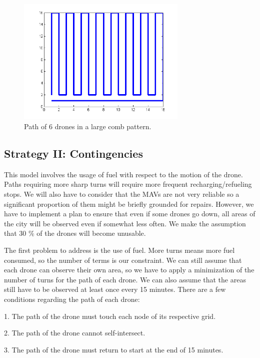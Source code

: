 \documentclass{article}
\begin{document}
\begin{figure}[htb!]
\begin{center}
\includegraphics[width=3.2in]{Comb.png}
\end{center}
\caption{Path of 6 drones in a large comb pattern.
\label{Comb}}
\end{figure}


\newpage 

\subsection{Strategy II: Contingencies}

This model involves the usage of fuel with respect to the motion of the drone. Paths requiring more sharp turns will require more frequent recharging/refueling stops. We will also have to consider that the MAVs are not very reliable so a significant proportion of them might be briefly grounded for repairs. However, we have to implement a plan to ensure that even if some drones go down, all areas of the city will be observed even if somewhat less often. We make the assumption that 30 \% of the drones will become unusable. 

The first problem to address is the use of fuel. More turns means more fuel consumed, so the number of terms is our constraint. We can still assume that each drone can observe their own area, so we have to apply a minimization of the number of turns for the path of each drone. We can also assume that the areas still have to be observed at least once every 15 minutes. There are a few conditions regarding the path of each drone:

1. The path of the drone must touch each node of its respective grid. 

2. The path of the drone cannot self-intersect.

3. The path of the drone must return to start at the end of 15 minutes. 
\end{document}
